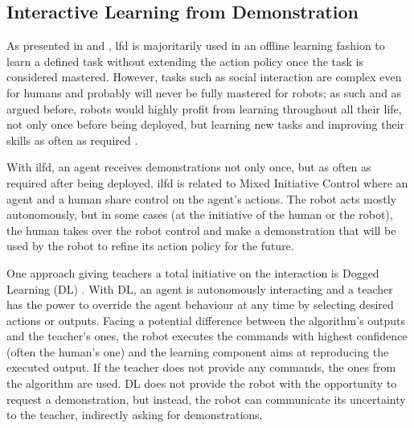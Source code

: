 
\subsection{Interactive Learning from Demonstration} \label{ssec:back_ilfd}

As presented in \cite{argall2009survey} and \cite{billard2008robot}, \gls{lfd} is majoritarily used in an offline learning fashion to learn a defined task without extending the action policy once the task is considered mastered. However, tasks such as social interaction are complex even for humans and probably will never be fully mastered for robots; as such and as argued before, robots would highly profit from learning throughout all their life, not only once before being deployed, but learning new tasks and improving their skills as often as required \citep{dautenhahn2004robots}.

With \gls{ilfd}, an agent receives demonstrations not only once, but as often as required after being deployed. \gls{ilfd} is related to Mixed Initiative Control \citep{adams2004mixed} where an agent and a human share control on the agent's actions. The robot acts mostly autonomously, but in some cases (at the initiative of the human or the robot), the human takes over the robot control and make a demonstration that will be used by the robot to refine its action policy for the future.

One approach giving teachers a total initiative on the interaction is Dogged Learning (DL) \citep{grollman2007dogged}. With DL, an agent is autonomously interacting and a teacher has the power to override the agent behaviour at any time by selecting desired actions or outputs. Facing a potential difference between the algorithm's outputs and the teacher's ones, the robot executes the commands with highest confidence (often the human's one) and the learning component aims at reproducing the executed output. If the teacher does not provide any commands, the ones from the algorithm are used. DL does not provide the robot with the opportunity to request a demonstration, but instead, the robot can communicate its uncertainty to the teacher, indirectly asking for demonstrations. 

